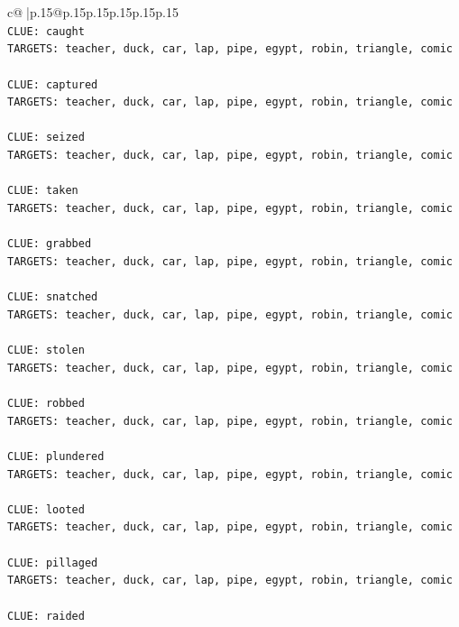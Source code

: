 \documentclass{article}
\begin{document}
{\begin{supertabular}{c@{$\;$}|p{.15\linewidth}@{}p{.15\linewidth}p{.15\linewidth}p{.15\linewidth}p{.15\linewidth}p{.15\linewidth}}
{{{\\ 
\texttt{CLUE: caught} \\
\texttt{TARGETS: teacher, duck, car, lap, pipe, egypt, robin, triangle, comic} \\
\\ 
\texttt{CLUE: captured} \\
\texttt{TARGETS: teacher, duck, car, lap, pipe, egypt, robin, triangle, comic} \\
\\ 
\texttt{CLUE: seized} \\
\texttt{TARGETS: teacher, duck, car, lap, pipe, egypt, robin, triangle, comic} \\
\\ 
\texttt{CLUE: taken} \\
\texttt{TARGETS: teacher, duck, car, lap, pipe, egypt, robin, triangle, comic} \\
\\ 
\texttt{CLUE: grabbed} \\
\texttt{TARGETS: teacher, duck, car, lap, pipe, egypt, robin, triangle, comic} \\
\\ 
\texttt{CLUE: snatched} \\
\texttt{TARGETS: teacher, duck, car, lap, pipe, egypt, robin, triangle, comic} \\
\\ 
\texttt{CLUE: stolen} \\
\texttt{TARGETS: teacher, duck, car, lap, pipe, egypt, robin, triangle, comic} \\
\\ 
\texttt{CLUE: robbed} \\
\texttt{TARGETS: teacher, duck, car, lap, pipe, egypt, robin, triangle, comic} \\
\\ 
\texttt{CLUE: plundered} \\
\texttt{TARGETS: teacher, duck, car, lap, pipe, egypt, robin, triangle, comic} \\
\\ 
\texttt{CLUE: looted} \\
\texttt{TARGETS: teacher, duck, car, lap, pipe, egypt, robin, triangle, comic} \\
\\ 
\texttt{CLUE: pillaged} \\
\texttt{TARGETS: teacher, duck, car, lap, pipe, egypt, robin, triangle, comic} \\
\\ 
\texttt{CLUE: raided} \\
}}}
\end{supertabular}}
\end{document}
